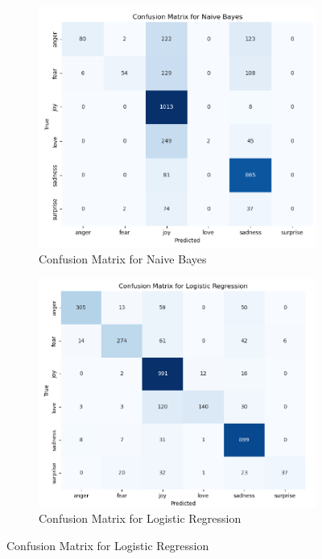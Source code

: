 \begin{figure}[h!]
	\centering
	\begin{subfigure}[b]{0.45\textwidth}
		\centering
		\includegraphics[width=\textwidth]{images/confusion_naive_bayes_init.png}
		\caption{Confusion Matrix for Naive Bayes}
		\label{fig:init_confusion_matrix_naive_bayes}
	\end{subfigure}
	\hfill
	\begin{subfigure}[b]{0.45\textwidth}
		\centering
		\includegraphics[width=\textwidth]{images/confusion_logistic_regression_init.png}
		\caption{Confusion Matrix for Logistic Regression}
		\label{fig:init_confusion_matrix_logistic_regression}
	\end{subfigure}
	

\end{figure}
